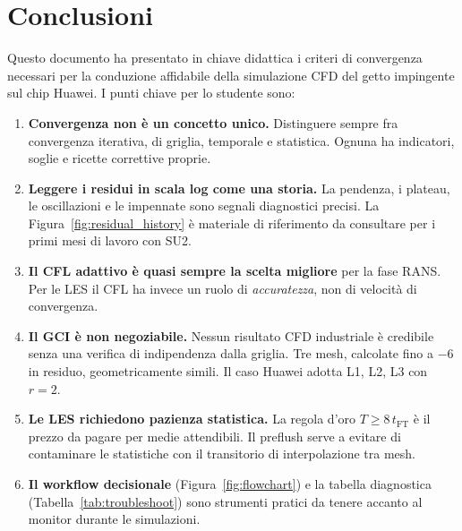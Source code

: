 \documentclass[11pt,a4paper]{article}
\newcommand{\tFT}{t_{\mathrm{FT}}}
\begin{document}
\section{Conclusioni}
\label{sec:conclusioni}

Questo documento ha presentato in chiave didattica i criteri di
convergenza necessari per la conduzione affidabile della simulazione
CFD del getto impingente sul chip Huawei. I punti chiave per lo
studente sono:

\begin{enumerate}
  \item \textbf{Convergenza non è un concetto unico.} Distinguere
    sempre fra convergenza iterativa, di griglia, temporale e
    statistica. Ognuna ha indicatori, soglie e ricette correttive
    proprie.

  \item \textbf{Leggere i residui in scala log come una storia.} La
    pendenza, i plateau, le oscillazioni e le impennate sono segnali
    diagnostici precisi. La Figura~\ref{fig:residual_history} è
    materiale di riferimento da consultare per i primi mesi di lavoro
    con SU2.

  \item \textbf{Il CFL adattivo è quasi sempre la scelta migliore} per
    la fase RANS. Per le LES il CFL ha invece un ruolo di
    \emph{accuratezza}, non di velocità di convergenza.

  \item \textbf{Il GCI è non negoziabile.} Nessun risultato CFD
    industriale è credibile senza una verifica di indipendenza dalla
    griglia. Tre mesh, calcolate fino a $-6$ in residuo,
    geometricamente simili. Il caso Huawei adotta L1, L2, L3 con
    $r=2$.

  \item \textbf{Le LES richiedono pazienza statistica.} La regola
    d'oro $T \geq 8\,\tFT$ è il prezzo da pagare per medie attendibili.
    Il preflush serve a evitare di contaminare le statistiche con il
    transitorio di interpolazione tra mesh.

  \item \textbf{Il workflow decisionale} (Figura~\ref{fig:flowchart})
    e la tabella diagnostica (Tabella~\ref{tab:troubleshoot}) sono
    strumenti pratici da tenere accanto al monitor durante le
    simulazioni.
\end{enumerate}
\end{document}
